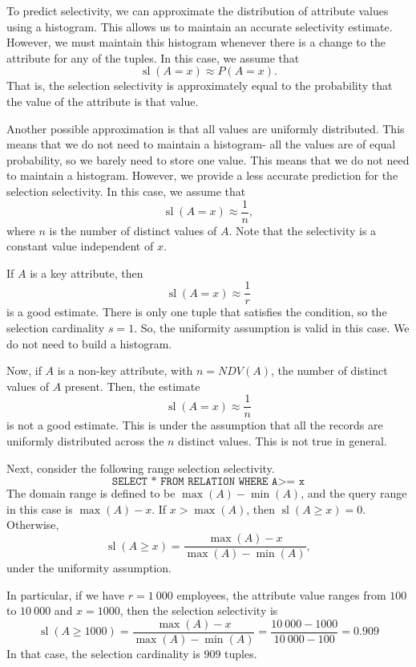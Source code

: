 \documentclass[a4paper, openany]{memoir}
\theoremstyle{definition}
\theoremstyle{plain}
\begin{document}
To predict selectivity, we can approximate the distribution of attribute values using a histogram. This allows us to maintain an accurate selectivity estimate. However, we must maintain this histogram whenever there is a change to the attribute for any of the tuples. In this case, we assume that
\[\operatorname{sl}(A = x) \approx P(A = x).\]
That is, the selection selectivity is approximately equal to the probability that the value of the attribute is that value.

Another possible approximation is that all values are uniformly distributed. This means that we do not need to maintain a histogram- all the values are of equal probability, so we barely need to store one value.
This means that we do not need to maintain a histogram. However, we provide a less accurate prediction for the selection selectivity. In this case, we assume that
\[\operatorname{sl}(A = x) \approx \frac{1}{n},\]
where $n$ is the number of distinct values of $A$. Note that the selectivity is a constant value independent of $x$. 

If $A$ is a key attribute, then
\[\operatorname{sl}(A = x) \approx \frac{1}{r}\]
is a good estimate. There is only one tuple that satisfies the condition, so the selection cardinality $s = 1$. So, the uniformity assumption is valid in this case. We do not need to build a histogram.

Now, if $A$ is a non-key attribute, with $n = NDV(A)$, the number of distinct values of $A$ present. Then, the estimate
\[\operatorname{sl}(A = x) \approx \frac{1}{n}\]
is not a good estimate. This is under the assumption that all the records are uniformly distributed across the $n$ distinct values. This is not true in general.

Next, consider the following range selection selectivity.
\[\texttt{SELECT * FROM RELATION WHERE A>= x}\]
The domain range is defined to be $\max (A) - \min (A)$, and the query range in this case is $\max(A) - x$. If $x > \max(A)$, then $\operatorname{sl}(A \geq x) = 0$. Otherwise,
\[\operatorname{sl}(A \geq x) = \frac{\max(A) - x}{\max(A) - \min(A)},\]
under the uniformity assumption.

In particular, if we have $r = 1 \ 000$ employees, the attribute value ranges from $100$ to $10 \ 000$ and $x = 1000$, then the selection selectivity is
\[\operatorname{sl}(A \geq 1000) = \frac{\max(A) - x}{\max(A) - \min(A)} = \frac{10 \ 000 - 1000}{10 \ 000 - 100} = 0.909\]
In that case, the selection cardinality is $909$ tuples.
\end{document}
